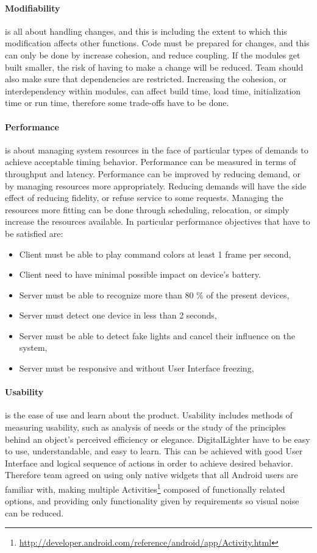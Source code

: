 \paragraph{Modifiability}
is all about handling changes, and this is including the extent to which this modification affects other functions. 
Code must be prepared for changes, and this can only be done by increase cohesion, and reduce coupling. 
If the modules get built smaller, the risk of having to make a change will be reduced. 
Team should also make sure that dependencies are restricted. 
Increasing the cohesion, or interdependency within modules, can affect build time, load time, initialization time or run time, therefore some trade-offs have to be done.

\paragraph{Performance}
is about managing system resources in the face of particular types of demands to achieve acceptable timing behavior.
Performance can be measured in terms of throughput and latency. 
Performance can be improved by reducing demand, or by managing resources more appropriately. 
Reducing demands will have the side effect of reducing fidelity, or refuse service to some requests. 
Managing the resources more fitting can be done through scheduling, relocation, or simply increase the resources available.
In particular performance objectives that have to be satisfied are:
\begin{itemize}
\item Client must be able to play command colors at least 1 frame per second,
\item Client need to have minimal possible impact on device's battery. 
\item Server must be able to recognize more than 80 \% of the present devices,
\item Server must detect one device in less than 2 seconds,
\item Server must be able to detect fake lights and cancel their influence on the system,
\item Server must be responsive and without User Interface freezing,
\end{itemize}

\paragraph{Usability}
is the ease of use and learn about the product.
Usability includes methods of measuring usability, such as analysis of needs or the study of the principles behind an object's perceived efficiency or elegance. DigitalLighter have to be easy to use, understandable, and easy to learn. This can be achieved with good User Interface and logical sequence of actions in order to achieve desired behavior. Therefore team agreed on using only native widgets that all Android users are familiar with, making multiple Activities\footnote{\url{http://developer.android.com/reference/android/app/Activity.html}} composed of functionally related options, and providing only functionality given by requirements so visual noise can be reduced. 

